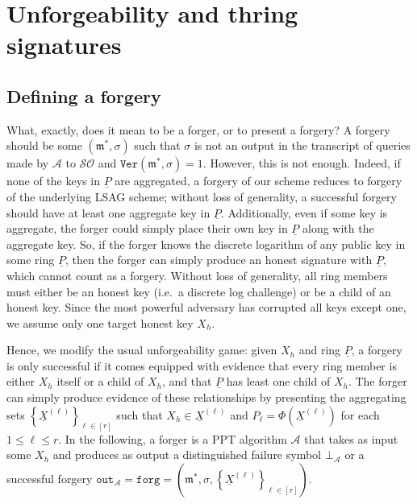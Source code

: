 \documentclass{iacrtrans}
\theoremstyle{definition}
\numberwithin{theorem}{subsection}
\numberwithin{lemma}{theorem}
\newcommand{\adversary}{\mathcal{A}}
\newcommand{\m}{\mathfrak{m}}
\begin{document}




\section{Unforgeability and thring signatures}\label{unf}


\subsection{Defining a forgery}

What, exactly, does it mean to be a forger, or to present a forgery? A forgery should be some $(\m^*, \sigma)$ such that $\sigma$ is not an output in the transcript of queries made by $\adversary$ to $\mathcal{SO}$ and $\texttt{Ver}(\m^*, \sigma)=1$. However, this is not enough. Indeed, if none of the keys in $\underline{P}$ are aggregated, a forgery of our scheme reduces to forgery of the underlying LSAG scheme; without loss of generality, a successful forgery should have at least one aggregate key in $\underline{P}$. Additionally, even if some key is aggregate, the forger could simply place their own key in $\underline{P}$ along with the aggregate key. So, if the forger knows the discrete logarithm of any public key in some ring $\underline{P}$, then the forger can simply produce an honest signature with $\underline{P}$, which cannot count as a forgery. Without loss of generality, all ring members must either be an honest key (i.e.\ a discrete log challenge) or be a child of an honest key. Since the most powerful adversary has corrupted all keys except one, we assume only one target honest key $X_h$. 

Hence, we modify the usual unforgeability game: given $X_h$ and ring $\underline{P}$, a forgery is only successful if it comes equipped with evidence that every ring member is either $X_h$ itself or a child of $X_h$, and that $\underline{P}$ has least one child of $X_h$.  The forger can simply produce evidence of these relationships by presenting the aggregating sets $\left\{\underline{X}^{(\ell)}\right\}_{\ell \in [r]}$ such that $X_h \in \underline{X}^{(\ell)}$ and $P_\ell = \Phi(\underline{X}^{(\ell)})$ for each $1 \leq \ell \leq r$. In the following, a forger is a PPT algorithm $\adversary$ that takes as input some $X_h$ and produces as output a distinguished failure symbol $\bot_\adversary$ or a successful forgery $\texttt{out}_{\adversary} = \texttt{forg} = (\m^*, \sigma, \left\{\underline{X}^{(\ell)}\right\}_{\ell \in [r]})$.
\end{document}
